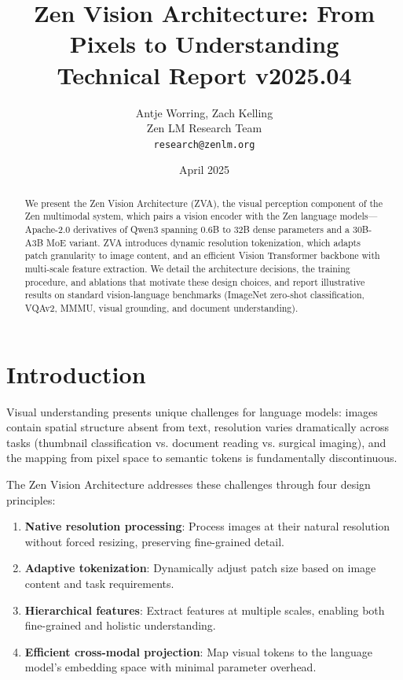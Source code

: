 \documentclass[11pt,a4paper]{article}
\title{\textbf{Zen Vision Architecture: From Pixels to Understanding}\\
\large Technical Report v2025.04}
\author{Antje Worring, Zach Kelling \\ Zen LM Research Team\\
\texttt{research@zenlm.org}}
\date{April 2025}
\begin{document}
\maketitle

\begin{abstract}
We present the Zen Vision Architecture (ZVA), the visual perception component of the Zen multimodal system, which pairs a vision encoder with the Zen language models---Apache-2.0 derivatives of Qwen3 spanning 0.6B to 32B dense parameters and a 30B-A3B MoE variant. ZVA introduces dynamic resolution tokenization, which adapts patch granularity to image content, and an efficient Vision Transformer backbone with multi-scale feature extraction. We detail the architecture decisions, the training procedure, and ablations that motivate these design choices, and report illustrative results on standard vision-language benchmarks (ImageNet zero-shot classification, VQAv2, MMMU, visual grounding, and document understanding).
\end{abstract}

\section{Introduction}

Visual understanding presents unique challenges for language models: images contain spatial structure absent from text, resolution varies dramatically across tasks (thumbnail classification vs. document reading vs. surgical imaging), and the mapping from pixel space to semantic tokens is fundamentally discontinuous.

The Zen Vision Architecture addresses these challenges through four design principles:

\begin{enumerate}
  \item \textbf{Native resolution processing}: Process images at their natural resolution without forced resizing, preserving fine-grained detail.
  \item \textbf{Adaptive tokenization}: Dynamically adjust patch size based on image content and task requirements.
  \item \textbf{Hierarchical features}: Extract features at multiple scales, enabling both fine-grained and holistic understanding.
  \item \textbf{Efficient cross-modal projection}: Map visual tokens to the language model's embedding space with minimal parameter overhead.
\end{enumerate}
\end{document}
